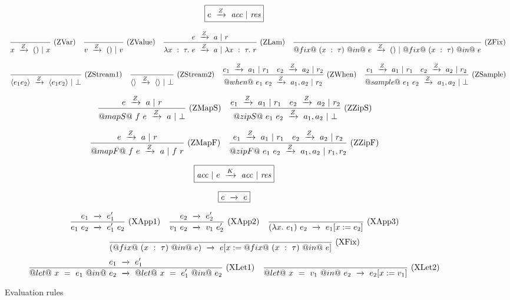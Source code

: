 
\begin{figure*}

$$
\boxed{\SourceStepZ{e}{\mi{acc}}{\mi{res}}}
$$

$$
\ruleAx
{
    \SourceStepZ{x}{()}{x}
}{ZVar}
\ruleAx
{
    \SourceStepZ{v}{()}{v}
}{ZValue}
\ruleIN
{
    \SourceStepZ{e}{a}{r}
}
{
    \SourceStepZ{\lambda{}x~:~\tau.~e}{a}{\lambda{}x~:~\tau.~r}
}{ZLam}
\ruleAx
{
    \SourceStepZ{@fix@~(x~:~\tau)~@in@~e}{()}{@fix@~(x~:~\tau)~@in@~e}
}{ZFix}
$$

$$
\ruleAx
{
    \SourceStepZ{\langle e_1 e_2 \rangle}{\langle e_1 e_2 \rangle}{\bot}
}{ZStream1}
\ruleAx
{
    \SourceStepZ{\langle \rangle}{\langle \rangle}{\bot}
}{ZStream2}
\ruleIN
{
    \SourceStepZ{e_1}{a_1}{r_1}
    \quad
    \SourceStepZ{e_2}{a_2}{r_2}
}
{
    \SourceStepZ{@when@~e_1~e_2}{a_1,a_2}{r_2}
}{ZWhen}
\ruleIN
{
    \SourceStepZ{e_1}{a_1}{r_1}
    \quad
    \SourceStepZ{e_2}{a_2}{r_2}
}
{
    \SourceStepZ{@sample@~e_1~e_2}{a_1,a_2}{\bot}
}{ZSample}
$$

$$
\ruleIN
{
    \SourceStepZ{e}{a}{r}
}
{
    \SourceStepZ{@mapS@~f~e}{a}{\bot}
}{ZMapS}
\ruleIN
{
    \SourceStepZ{e_1}{a_1}{r_1}
    \quad
    \SourceStepZ{e_2}{a_2}{r_2}
}
{
    \SourceStepZ{@zipS@~e_1~e_2}{a_1,a_2}{\bot}
}{ZZipS}
$$

$$
\ruleIN
{
    \SourceStepZ{e}{a}{r}
}
{
    \SourceStepZ{@mapF@~f~e}{a}{f~r}
}{ZMapF}
\ruleIN
{
    \SourceStepZ{e_1}{a_1}{r_1}
    \quad
    \SourceStepZ{e_2}{a_2}{r_2}
}
{
    \SourceStepZ{@zipF@~e_1~e_2}{a_1,a_2}{r_1,r_2}
}{ZZipF}
$$

$$
\boxed{\SourceStepK{\mi{acc}}{e}{\mi{acc}}{\mi{res}}}
$$

$$
\boxed{\SourceStepX{e}{e}}
$$

$$
\ruleIN
{
    \SourceStepX{e_1}{e_1'}
}
{
    \SourceStepX{e_1~e_2}{e_1'~e_2}
}{XApp1}
\ruleIN
{
    \SourceStepX{e_2}{e_2'}
}
{
    \SourceStepX{v_1~e_2}{v_1~e_2'}
}{XApp2}
\ruleAx
{
    \SourceStepX{(\lambda{}x.~e_1)~e_2}{e_1[x:=e_2]}
}{XApp3}
$$
$$
\ruleAx
{
    \SourceStepX{(@fix@~(x~:~\tau)~@in@~e)}{e[x:=@fix@~(x~:~\tau)~@in@~e]}
}{XFix}
$$
$$
\ruleIN
{
    \SourceStepX{e_1}{e_1'}
}
{
    \SourceStepX{@let@~x~=~e_1~@in@~e_2}{@let@~x~=~e_1'~@in@~e_2}
}{XLet1}
\ruleAx
{
    \SourceStepX{@let@~x~=~v_1~@in@~e_2}{e_2[x:=v_1]}
}{XLet2}
$$

\caption{Evaluation rules}
\label{fig:source:eval}
\end{figure*}


